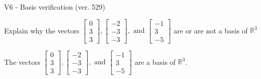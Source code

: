 \begin{exercise}
  \begin{exerciseTitle}V6 - Basis verification (ver. 529)\end{exerciseTitle}
  \begin{exerciseStatement}
    Explain why the vectors \(\left[\begin{array}{r}
0 \\
3 \\
3
\end{array}\right] , \left[\begin{array}{r}
-2 \\
-3 \\
-3
\end{array}\right] , \text{ and } \left[\begin{array}{r}
-1 \\
3 \\
-5
\end{array}\right]\) are or are not a basis of \(\mathbb{R}^3\)	


  \end{exerciseStatement}
  \begin{exerciseAnswer}
   The vectors \(\left[\begin{array}{r}
0 \\
3 \\
3
\end{array}\right] , \left[\begin{array}{r}
-2 \\
-3 \\
-3
\end{array}\right] , \text{ and } \left[\begin{array}{r}
-1 \\
3 \\
-5
\end{array}\right]\) 
  	 are  a basis of \(\mathbb{R}^3\).
  


  \end{exerciseAnswer}
\end{exercise}